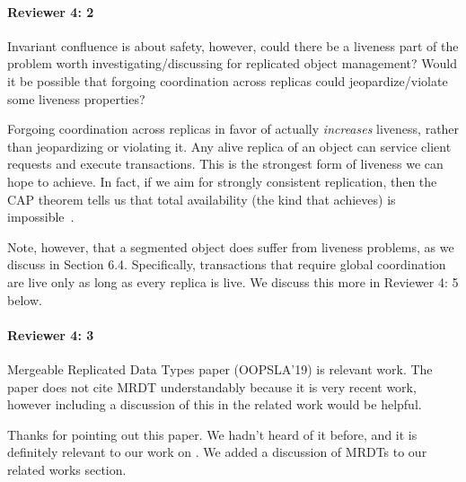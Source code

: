 \documentclass[9pt]{article}
\begin{document}
\begin{multicols*}{2}
\paragraph{Reviewer 4: 2}
\begin{feedback}
  Invariant confluence is about safety, however, could there be a liveness part
  of the problem worth investigating/discussing for replicated object
  management? Would it be possible that forgoing coordination across replicas
  could jeopardize/violate some liveness properties?
\end{feedback}
Forgoing coordination across replicas in favor of \invariantconfluence{}
actually \emph{increases} liveness, rather than jeopardizing or violating it.
Any alive replica of an \invariantconfluent{} object can service client
requests and execute transactions. This is the strongest form of liveness we
can hope to achieve. In fact, if we aim for strongly consistent replication,
then the CAP theorem tells us that total availability (the kind that
\invariantconfluence{} achieves) is impossible~\cite{brewer2012cap,
gilbert2002brewer}.

Note, however, that a segmented \invariantconfluent{} object does suffer from
liveness problems, as we discuss in Section 6.4. Specifically, transactions
that require global coordination are live only as long as every replica is
live. We discuss this more in Reviewer 4: 5 below.

\paragraph{Reviewer 4: 3}
\begin{feedback}
  Mergeable Replicated Data Types paper (OOPSLA'19) is relevant work. The paper
  does not cite MRDT understandably because it is very recent work, however
  including a discussion of this in the related work would be helpful.
\end{feedback}
Thanks for pointing out this paper. We hadn't heard of it before, and it is
definitely relevant to our work on \invariantconfluence{}. We added a
discussion of MRDTs to our related works section.


\end{multicols*}
\end{document}
